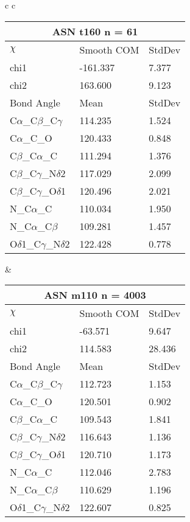 \begin{longtable}{ c c }
  \\
  \begin{tabular}{ l l l }
  \toprule
  \multicolumn{3}{c}{ASN \textbf{t160} n = 61} \\ \toprule
  $\chi$       & Smooth COM & StdDev \\ \midrule
  chi1 & -161.337 & 7.377 \\ 
  chi2 & 163.600 & 9.123 \\ \midrule
  Bond Angle   & Mean     & StdDev \\ \midrule
  C$\alpha$\_C$\beta$\_C$\gamma$ & 114.235 & 1.524\\
  C$\alpha$\_C\_O & 120.433 & 0.848\\
  C$\beta$\_C$\alpha$\_C & 111.294 & 1.376\\
  C$\beta$\_C$\gamma$\_N$\delta$2 & 117.029 & 2.099\\
  C$\beta$\_C$\gamma$\_O$\delta$1 & 120.496 & 2.021\\
  N\_C$\alpha$\_C & 110.034 & 1.950\\
  N\_C$\alpha$\_C$\beta$ & 109.281 & 1.457\\
  O$\delta$1\_C$\gamma$\_N$\delta$2 & 122.428 & 0.778\\
  \bottomrule
  \end{tabular}
  &
  \begin{tabular}{ l l l }
  \toprule
  \multicolumn{3}{c}{ASN \textbf{m110} n = 4003} \\ \toprule
  $\chi$       & Smooth COM & StdDev \\ \midrule
  chi1 & -63.571 & 9.647 \\ 
  chi2 & 114.583 & 28.436 \\ \midrule
  Bond Angle   & Mean     & StdDev \\ \midrule
  C$\alpha$\_C$\beta$\_C$\gamma$ & 112.723 & 1.153\\
  C$\alpha$\_C\_O & 120.501 & 0.902\\
  C$\beta$\_C$\alpha$\_C & 109.543 & 1.841\\
  C$\beta$\_C$\gamma$\_N$\delta$2 & 116.643 & 1.136\\
  C$\beta$\_C$\gamma$\_O$\delta$1 & 120.710 & 1.173\\
  N\_C$\alpha$\_C & 112.046 & 2.783\\
  N\_C$\alpha$\_C$\beta$ & 110.629 & 1.196\\
  O$\delta$1\_C$\gamma$\_N$\delta$2 & 122.607 & 0.825\\
  \bottomrule
  \end{tabular}
  \\

\end{longtable}
